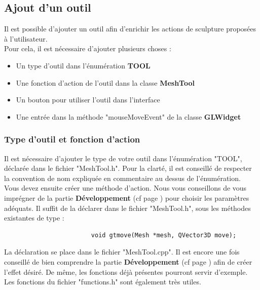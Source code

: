 \documentclass[a4paper]{memoir}
\begin{document}
			\subsection{Ajout d'un outil}
				Il est possible d'ajouter un outil afin d'enrichir les actions de sculpture proposées à l'utilisateur.\\
				Pour cela, il est nécessaire d'ajouter plusieurs choses :
				\begin{itemize}
					\item Un type d'outil dans l'énumération \textbf{TOOL}
					\item Une fonction d'action de l'outil dans la classe \textbf{MeshTool}
					\item Un bouton pour utiliser l'outil dans l'interface
					\item Une entrée dans la méthode "mouseMoveEvent" de la classe \textbf{GLWidget}
				\end{itemize}
				
				\subsubsection{Type d'outil et fonction d'action}
					Il est nécessaire d'ajouter le type de votre outil dans l'énumération "TOOL", déclarée dans le fichier "MeshTool.h". Pour la clarté, il 
					est conseillé de respecter la convention de nom expliquée en commentaire au dessus de l'énumération.\\
					Vous devez ensuite créer une méthode d'action. Nous vous conseillons de vous imprégner de la partie \textbf{Développement} (cf page 
					\pageref{tool-dev}) pour choisir les paramètres adéquats. Il suffit de la déclarer dans le fichier "MeshTool.h", sous les méthodes 
					existantes de type :
					\begin{verbatim}
						void gtmove(Mesh *mesh, QVector3D move);
					\end{verbatim}
					La déclaration se place dans le fichier "MeshTool.cpp". Il est encore une fois conseillé de bien comprendre la partie 
					\textbf{Développement} (cf page \pageref{tool-dev}) afin de créer l'effet désiré. De même, les fonctions déjà présentes pourront servir 
					d'exemple. Les fonctions du fichier "functions.h" sont également très utiles.
					
\end{document}
